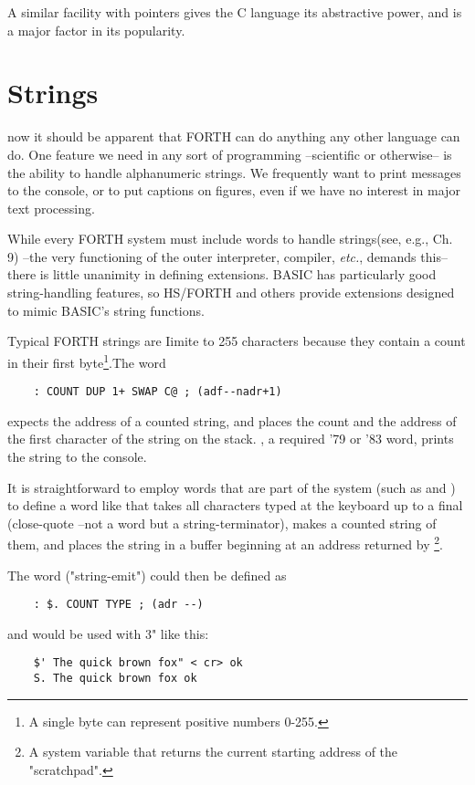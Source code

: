 A similar facility with pointers gives the C language its abstractive power, and is a major factor in its popularity.

\section{Strings}

 now it should be apparent that FORTH can do anything any other language can do. One feature we need in any sort of programming --scientific or otherwise-- is the ability to handle alphanumeric strings. We frequently want to print messages to the console, or to put captions on figures, even if we have no interest in major text processing.

While every FORTH system must include words to handle strings(see, e.g., \FTR Ch. 9) --the very functioning of the outer interpreter, compiler, \textit{etc.}, demands this-- there is little unanimity in defining extensions. BASIC has particularly good string-handling features, so HS/FORTH and others provide extensions designed to mimic BASIC’s string functions.

Typical FORTH strings are Iimite to 255 characters because they contain a count in their first byte\footnote{A single byte can represent positive numbers 0-255.}.The word 
\begin{lstlisting}
    : COUNT DUP 1+ SWAP C@ ; (adf--nadr+1)
\end{lstlisting}

expects the address of a counted string, and places the count and
the address of the first character of the string on the stack. , a required ’79 or ’83 word, prints the string to the console.

It is straightforward to employ words that are part of the system (such as  and ) to define a word like  that takes all characters typed at the keyboard up to a final  (close-quote --not a word but a string-terminator), makes a counted string of them, and places the string in a buffer beginning at an address returned by \footnote{A system variable that returns the current starting address of the "scratchpad".}.

The word  ("string-emit") could then be defined as
\begin{lstlisting}
    : $. COUNT TYPE ; (adr --)
\end{lstlisting}

and would be used with 3" like this:
\begin{lstlisting}
    $' The quick brown fox" < cr> ok
    S. The quick brown fox ok
\end{lstlisting}

